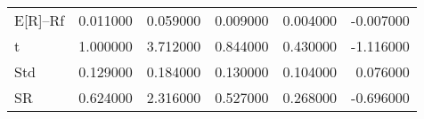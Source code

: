 \begin{tabular}{lrrrrr}
\toprule
\midrule
E[R]--Rf & 0.011000 & 0.059000 & 0.009000 & 0.004000 & -0.007000 \\
t & 1.000000 & 3.712000 & 0.844000 & 0.430000 & -1.116000 \\
Std & 0.129000 & 0.184000 & 0.130000 & 0.104000 & 0.076000 \\
SR & 0.624000 & 2.316000 & 0.527000 & 0.268000 & -0.696000 \\
\bottomrule
\end{tabular}
